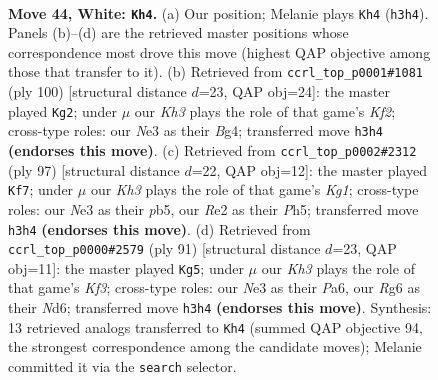 \documentclass[11pt]{article}
\begin{document}
\clearpage

\begin{figure}[p]\centering
\begin{subfigure}{0.46\textwidth}\centering
\resizebox{\linewidth}{!}{%
\newchessgame
\chessboard[
  setfen={7k/1r4b1/6R1/8/2P5/4N2K/4R3/8 w - - 8 44},
  showmover=false,
  pgfstyle=straightmove, color=movearrow, markmove={h3-h4}
]}
\caption{}
\end{subfigure}\hfill
\begin{subfigure}{0.46\textwidth}\centering
\resizebox{\linewidth}{!}{%
\newchessgame
\chessboard[
  setfen={8/8/5k2/3Rb3/r5B1/7P/5K2/8 w - - 11 51},
  showmover=false,
  pgfstyle=straightmove, color=movearrow, markmove={f2-g2}
]}
\caption{}
\end{subfigure}
\\[4pt]
\begin{subfigure}{0.46\textwidth}\centering
\resizebox{\linewidth}{!}{%
\newchessgame
\chessboard[
  setfen={6k1/8/8/1PP3Bp/5K2/8/6r1/8 b - - 0 49},
  showmover=false,
  pgfstyle=straightmove, color=movearrow, markmove={g8-f7}
]}
\caption{}
\end{subfigure}\hfill
\begin{subfigure}{0.46\textwidth}\centering
\resizebox{\linewidth}{!}{%
\newchessgame
\chessboard[
  setfen={8/1B5R/p2n1k2/7P/r7/6K1/8/8 b - - 0 46},
  showmover=false,
  pgfstyle=straightmove, color=movearrow, markmove={f6-g5}
]}
\caption{}
\end{subfigure}
\caption{\textbf{Move 44, White: \texttt{Kh4}.} (a) Our position; Melanie plays \texttt{Kh4} (\texttt{h3h4}). Panels (b)--(d) are the retrieved master positions whose correspondence most drove this move (highest QAP objective among those that transfer to it). (b) Retrieved from \texttt{ccrl\_top\_p0001\#1081} (ply 100) [structural distance $d$=23, QAP obj=24]: the master played \texttt{Kg2}; under $\mu$ our \emph{Kh3} plays the role of that game's \emph{Kf2}; cross-type roles: our \emph{N}e3 as their \emph{B}g4; transferred move \texttt{h3h4} \textbf{(endorses this move)}. (c) Retrieved from \texttt{ccrl\_top\_p0002\#2312} (ply 97) [structural distance $d$=22, QAP obj=12]: the master played \texttt{Kf7}; under $\mu$ our \emph{Kh3} plays the role of that game's \emph{Kg1}; cross-type roles: our \emph{N}e3 as their \emph{p}b5, our \emph{R}e2 as their \emph{P}h5; transferred move \texttt{h3h4} \textbf{(endorses this move)}. (d) Retrieved from \texttt{ccrl\_top\_p0000\#2579} (ply 91) [structural distance $d$=23, QAP obj=11]: the master played \texttt{Kg5}; under $\mu$ our \emph{Kh3} plays the role of that game's \emph{Kf3}; cross-type roles: our \emph{N}e3 as their \emph{P}a6, our \emph{R}g6 as their \emph{N}d6; transferred move \texttt{h3h4} \textbf{(endorses this move)}. Synthesis: 13 retrieved analogs transferred to \texttt{Kh4} (summed QAP objective 94, the strongest correspondence among the candidate moves); Melanie committed it via the \texttt{search} selector.}
\label{fig:thought-m86}
\end{figure}
\end{document}
